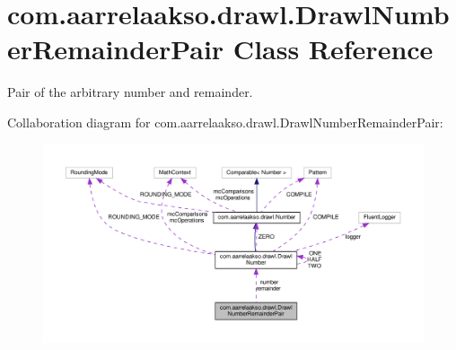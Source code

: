 \hypertarget{classcom_1_1aarrelaakso_1_1drawl_1_1_drawl_number_remainder_pair}{}\section{com.\+aarrelaakso.\+drawl.\+Drawl\+Number\+Remainder\+Pair Class Reference}
\label{classcom_1_1aarrelaakso_1_1drawl_1_1_drawl_number_remainder_pair}


Pair of the arbitrary number and remainder.  




Collaboration diagram for com.\+aarrelaakso.\+drawl.\+Drawl\+Number\+Remainder\+Pair\+:\nopagebreak
\begin{figure}[H]
\begin{center}
\leavevmode
\includegraphics[width=350pt]{d9/dde/classcom_1_1aarrelaakso_1_1drawl_1_1_drawl_number_remainder_pair__coll__graph}
\end{center}
\end{figure}
